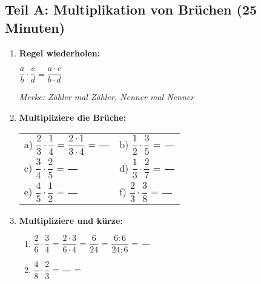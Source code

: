 \subsection*{Teil A: Multiplikation von Brüchen (25 Minuten)}

\begin{enumerate}[label=\arabic*.]
    \item \textbf{Regel wiederholen:}
    \vspace{0.5cm}

    $\dfrac{a}{b} \cdot \dfrac{c}{d} = \dfrac{a \cdot c}{b \cdot d}$

    \textit{Merke: Zähler mal Zähler, Nenner mal Nenner}

    \vspace{1cm}

    \item \textbf{Multipliziere die Brüche:}
    \vspace{0.5cm}

    \begin{tabular}{ll}
        a) $\dfrac{2}{3} \cdot \dfrac{1}{4}$ = $\dfrac{2 \cdot 1}{3 \cdot 4}$ = $\dfrac{\phantom{00}}{\phantom{00}}$ & b) $\dfrac{1}{2} \cdot \dfrac{3}{5}$ = $\dfrac{\phantom{00}}{\phantom{00}}$ \\[4ex]
        c) $\dfrac{3}{4} \cdot \dfrac{2}{5}$ = $\dfrac{\phantom{00}}{\phantom{00}}$ & d) $\dfrac{1}{3} \cdot \dfrac{2}{7}$ = $\dfrac{\phantom{00}}{\phantom{00}}$ \\[4ex]
        e) $\dfrac{4}{5} \cdot \dfrac{1}{2}$ = $\dfrac{\phantom{00}}{\phantom{00}}$ & f) $\dfrac{2}{3} \cdot \dfrac{3}{8}$ = $\dfrac{\phantom{00}}{\phantom{00}}$
    \end{tabular}

    \vspace{1cm}

    \item \textbf{Multipliziere und kürze:}
    \vspace{0.5cm}

    \begin{enumerate}[label=\alph*)]
        \item $\dfrac{2}{6} \cdot \dfrac{3}{4}$ = $\dfrac{2 \cdot 3}{6 \cdot 4}$ = $\dfrac{6}{24}$ = $\dfrac{6:6}{24:6}$ = $\dfrac{\phantom{00}}{\phantom{00}}$

        \vspace{0.5cm}

        \item $\dfrac{4}{8} \cdot \dfrac{2}{3}$ = $\dfrac{\phantom{00}}{\phantom{00}}$ = \underline{\hspace{3cm}}


\end{enumerate}
\end{enumerate}

